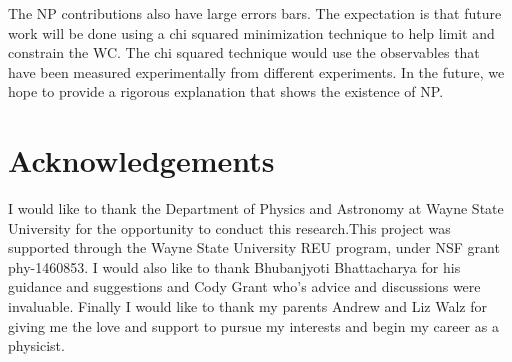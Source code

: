 \documentclass[12pt]{article}
\begin{document}
The NP contributions also have large errors bars. The expectation is that future work will be done using a chi squared minimization technique to help limit and constrain the WC. The chi squared technique would use the observables that have been measured experimentally from different experiments. In the future, we hope to provide a rigorous explanation that shows the existence of NP.  
\section{Acknowledgements}
I would like to thank the Department of Physics and Astronomy at Wayne State University for the opportunity to conduct this research.This project was supported through the Wayne State University REU program, under NSF grant phy-1460853. I would also like to thank Bhubanjyoti Bhattacharya for his guidance and suggestions and Cody Grant who's advice and discussions were invaluable. Finally I would like to thank my parents Andrew and Liz Walz for giving me the love and support to pursue my interests and begin my career as a physicist.  
\end{document}

